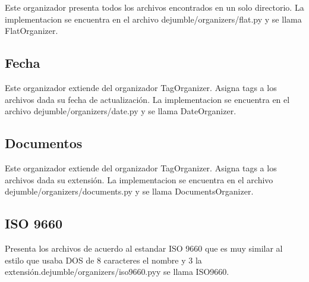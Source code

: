 Este organizador presenta todos los archivos encontrados en un solo directorio. La implementacion se encuentra en el archivo dejumble/organizers/flat.py y se llama FlatOrganizer.

\subsection{Fecha}

Este organizador extiende del organizador TagOrganizer. Asigna tags a los archivos dada su fecha de actualización. La implementacion se encuentra en el archivo dejumble/organizers/date.py y se llama DateOrganizer.

\subsection{Documentos}

Este organizador extiende del organizador TagOrganizer. Asigna tags a los archivos dada su extensión. La implementacion se encuentra en el archivo dejumble/organizers/documents.py y se llama DocumentsOrganizer.

\subsection{ISO 9660}

Presenta los archivos de acuerdo al estandar ISO 9660 que es muy similar al estilo que usaba DOS de 8 caracteres el nombre y 3 la extensión.dejumble/organizers/iso9660.pyy se llama ISO9660.


